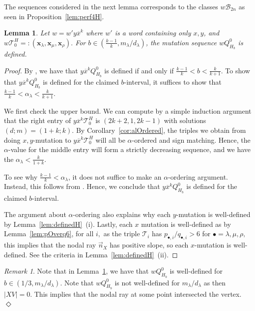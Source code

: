 \documentclass[11pt, reqno]{amsart}
\newtheorem{lemma}[thm]{Lemma}
\theoremstyle{remark}
\numberwithin{equation}{subsection}
\numberwithin{figure}{section}
\theoremstyle{customremark}
\newtheorem{rmk_no_diamond}[thm]{Remark}
\newenvironment{rmk}{\begin{rmk_no_diamond} } {\hfill$\er$ \end{rmk_no_diamond}}
\newcommand{\Tt}{\mathcal{T}}
\newcommand{\vn}{{\vec{n}}}
\newcommand{\ov}{\overline}
\newcommand{\al}{{\alpha}}
\newcommand{\la}{{\lambda}}
\newcommand{\er}{{\Diamond}}
\begin{document}
The sequences considered in the next lemma corresponds to the classes $w\mathcal{B}_{2n}$ as seen in Proposition~\ref{lem:perf4H}. 
\begin{lemma} \label{lem:bDefH1}
Let $w=w'y\ov{x}^k$ where $w'$ is a word containing only $x,y$, and $w\Tt_0^H=:(\bm{x}_\la,\bm{x}_\mu,\bm{x}_\rho).$ For $b\in (\frac{k-1}{k},m_\la/d_\la)$, the mutation sequence $wQ_{H_b}^0$ is defined. 
\end{lemma}
\begin{proof}
    By \cite[Proposition 3.9]{M1}, we have that 
    $y\ov{x}^kQ_{H_b}^0$ is defined if and only if $\frac{k-1}{k} < b < \frac{k}{k+1}$. To show that $y\ov{x}^kQ_{H_b}^0$ is defined for the claimed $b$-interval, it suffices to show that $\frac{k-1}{k}<\al_\la<\frac{k}{k+1}$. 
    
    We first check the upper bound. We can compute by a simple induction argument that the right entry of $y\ov{x}^k\Tt_0^H$ is $(2k+2,1,2k-1)$ with solutions $(d;m)=(1+k;k).$ By Corollary~\ref{cor:alOrdered}, the triples we obtain from doing $x,y$-mutation to $y\ov{x}^k\Tt_0^H$ will all be $\al$-ordered and sign matching. Hence, the $\al$-value for the middle entry will form a strictly decreasing sequence, and we have the $\al_\la<\frac{k}{1+k}.$ 

    To see why $\frac{k-1}{k}<\al_\la$, it does not suffice to make an $\al$-ordering argument. Instead, this follows from \cite[Lemma 5.4(i,ii)]{M1}. Hence, we conclude that $y\ov{x}^kQ_{H_b}^0$ is defined for the claimed $b$-interval. 

    The argument about $\al$-ordering also explains why each $y$-mutation is well-defined by  Lemma~\ref{lem:definedH}~(i). Lastly, each $x$ mutation is well-defined as by Lemma~\ref{lem:pOverq6}, for all $i,$ as the triple $\Tt_i$ has $p_{\bullet,i}/q_{\bullet,i}>6$ for $\bullet=\la,\mu,\rho,$ this implies that the nodal ray $\vn_X$ has positive slope, so each $x$-mutation is well-defined. See the criteria in Lemma~\ref{lem:definedH}~(ii). 
 
\end{proof}

\begin{rmk}
    Note that in Lemma~\ref{lem:bDefH1}, we have that $wQ^0_{H_b}$ is well-defined for $b \in (1/3,m_\la/d_\la).$ Note that $wQ^0_{H_b}$ is not well-defined for $m_\la/d_\la$ as then $|XV|=0$. This implies that the nodal ray at some point intersected the vertex. 
\end{rmk}
\end{document}
